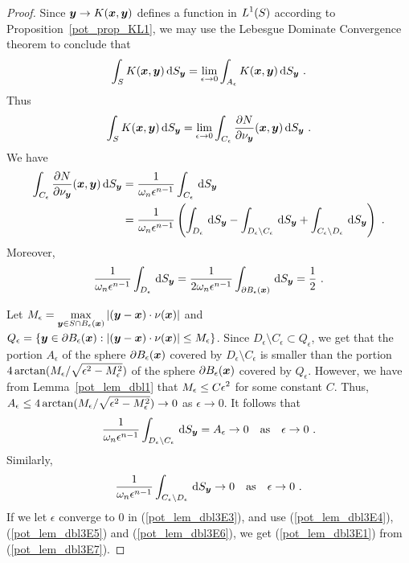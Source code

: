 \begin{proof}
Since ${\bm{y}} \to K({\bm{x}},{\bm{y}})$ defines a function in
$\displaystyle L^1(S)$
according to Proposition~\ref{pot_prop_KL1}, we may use the Lebesgue
Dominate Convergence theorem to conclude that
\[
\int_S  K({\bm{x}},{\bm{y}}) \,\mathrm{d}{S}_{{\bm{y}}}
= \lim_{\epsilon \to 0} \int_{A_\epsilon}  K({\bm{x}},{\bm{y}}) \,\mathrm{d}{S}_{{\bm{y}}} \ .
\]
Thus
\begin{equation} \label{pot_lem_dbl3E7}
\int_S  K(\VEC{x},\VEC{y}) \dss{S}{y}
= \lim_{\epsilon \to 0}
\int_{C_\epsilon} \pdydx{N}{\nu_\VEC{y}}(\VEC{x},\VEC{y}) \dss{S}{y} \ .
\end{equation}
We have
\begin{align}
\int_{C_\epsilon} \frac{\partial{N}}{\partial \nu_{\bm{y}}}({\bm{x}},{\bm{y}}) \,\mathrm{d}{S}_{{\bm{y}}}
&= \frac{1}{\omega_n \epsilon^{n-1}} \int_{C_\epsilon} \,\mathrm{d}{S}_{{\bm{y}}} \nonumber \\
&= \frac{1}{\omega_n \epsilon^{n-1}} \left( \int_{D_\epsilon} \,\mathrm{d}{S}_{{\bm{y}}}
- \int_{D_\epsilon \setminus C_\epsilon} \,\mathrm{d}{S}_{{\bm{y}}}
+ \int_{C_\epsilon \setminus D_\epsilon} \,\mathrm{d}{S}_{{\bm{y}}} \right) \ .
\label{pot_lem_dbl3E3} 
\end{align}
Moreover,
\begin{equation} \label{pot_lem_dbl3E4}
\frac{1}{\omega_n \epsilon^{n-1}} \int_{D_\epsilon} \dss{S}{y}
= \frac{1}{2 \omega_n \epsilon^{n-1}}
\int_{\partial B_\epsilon(\VEC{x})} \dss{S}{y} = \frac{1}{2} \ .
\end{equation}

Let
$\displaystyle
M_\epsilon = \max_{{\bm{y}}\in S \cap B_\epsilon({\bm{x}})} \left|
  \left( {\bm{y}} - {\bm{x}}\right) \cdot \nu({\bm{x}}) \right|$
and
$Q_\epsilon = \left\{ {\bm{y}} \in \partial B_\epsilon({\bm{x}}) :
\left| ({\bm{y}} - {\bm{x}}) \cdot \nu({\bm{x}}) \right| \leq
M_\epsilon \right\}$.
Since $D_\epsilon \setminus C_\epsilon \subset Q_\epsilon$, we get
that the portion $A_\epsilon$ of the sphere
$\partial B_\epsilon({\bm{x}})$ covered by $D_\epsilon \setminus C_\epsilon$ 
is smaller than the portion
$\displaystyle 4 \arctan(M_\epsilon/\sqrt{\epsilon^2 - M_\epsilon^2})$
of the sphere $\partial B_\epsilon({\bm{x}})$ covered by $Q_\epsilon$. 
However, we have from Lemma~\ref{pot_lem_dbl1} that
$\displaystyle M_\epsilon \leq C \epsilon^2$ for some constant $C$.  Thus,
$\displaystyle A_\epsilon \leq
4 \arctan(M_\epsilon/\sqrt{\epsilon^2 - M_\epsilon^2}) \to 0$ 
as $\epsilon \to 0$.  It follows that
\begin{equation} \label{pot_lem_dbl3E5}
\frac{1}{\omega_n \epsilon^{n-1}} \int_{D_\epsilon \setminus C_\epsilon} \,\mathrm{d}{S}_{{\bm{y}}}
= A_\epsilon \to 0 \quad \text{as} \quad \epsilon \to 0 \ .
\end{equation}
Similarly,
\begin{equation} \label{pot_lem_dbl3E6}
\frac{1}{\omega_n \epsilon^{n-1}} \int_{C_\epsilon \setminus D_\epsilon} \,\mathrm{d}{S}_{{\bm{y}}}
\to 0 \quad \text{as} \quad \epsilon \to 0 \ .
\end{equation}
If we let $\epsilon$ converge to $0$ in (\ref{pot_lem_dbl3E3}), and
use (\ref{pot_lem_dbl3E4}), (\ref{pot_lem_dbl3E5}) and
(\ref{pot_lem_dbl3E6}), we get (\ref{pot_lem_dbl3E1}) from
(\ref{pot_lem_dbl3E7}).
\end{proof}

